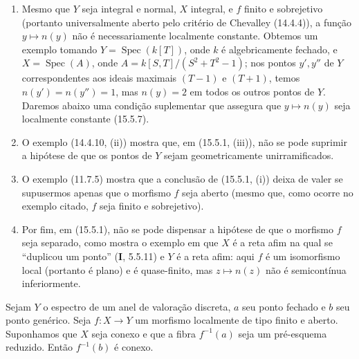 \begin{remarks}[15.5.5]
\label{IV.15.5.5}
\begin{enumerate}[label=\emph{(\roman*)}]
  \item Mesmo que $Y$ seja integral e normal, $X$ integral, e $f$ finito e sobrejetivo (portanto universalmente aberto pelo critério de Chevalley (14.4.4)), a função $y\mapsto n(y)$ não é necessariamente localmente constante. Obtemos um exemplo tomando $Y=\operatorname{Spec}(k[T])$, onde $k$ é algebricamente fechado, e $X=\operatorname{Spec}(A)$, onde $A=k[S,T]/(S^2+T^2-1)$; nos pontos $y',y''$ de $Y$ correspondentes aos ideais maximais $(T-1)$ e $(T+1)$, temos $n(y')=n(y'')=1$, mas $n(y)=2$ em todos os outros pontos de $Y$. Daremos abaixo uma condição suplementar que assegura que $y\mapsto n(y)$ seja localmente constante (15.5.7).
  \item O exemplo (14.4.10, (ii)) mostra que, em (15.5.1, (iii)), não se pode suprimir a hipótese de que os pontos de $Y$ sejam geometricamente unirramificados.
  \item O exemplo (11.7.5) mostra que a conclusão de (15.5.1, (i)) deixa de valer se supusermos apenas que o morfismo $f$ seja aberto (mesmo que, como ocorre no exemplo citado, $f$ seja finito e sobrejetivo).
  \item Por fim, em (15.5.1), não se pode dispensar a hipótese de que o morfismo $f$ seja separado, como mostra o exemplo em que $X$ é a reta afim na qual se ``duplicou um ponto'' (\textbf{I}, 5.5.11) e $Y$ é a reta afim: aqui $f$ é um isomorfismo local (portanto é plano) e é quase-finito, mas $z\mapsto n(z)$ não é semicontínua inferiormente.
\end{enumerate}
\end{remarks}

\begin{lemma}[15.5.6]
\label{IV.15.5.6}
Sejam $Y$ o espectro de um anel de valoração discreta, $a$ seu ponto fechado e $b$ seu ponto genérico. Seja $f:X\to Y$ um morfismo localmente de tipo finito e aberto. Suponhamos que $X$ seja conexo e que a fibra $f^{-1}(a)$ seja um pré-esquema reduzido. Então $f^{-1}(b)$ é conexo.
\end{lemma}

